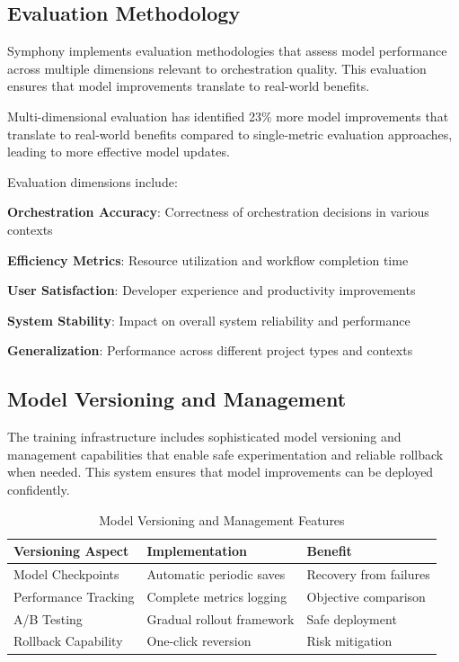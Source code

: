 \subsection*{Evaluation Methodology}

Symphony implements evaluation methodologies that assess model performance across multiple dimensions relevant to orchestration quality. This evaluation ensures that model improvements translate to real-world benefits.

\begin{successbox}
Multi-dimensional evaluation has identified 23\% more model improvements that translate to real-world benefits compared to single-metric evaluation approaches, leading to more effective model updates.
\end{successbox}

Evaluation dimensions include:

\begin{expandedlist}
    \item \textbf{Orchestration Accuracy}: Correctness of orchestration decisions in various contexts
    \item \textbf{Efficiency Metrics}: Resource utilization and workflow completion time
    \item \textbf{User Satisfaction}: Developer experience and productivity improvements
    \item \textbf{System Stability}: Impact on overall system reliability and performance
    \item \textbf{Generalization}: Performance across different project types and contexts
\end{expandedlist}

\subsection*{Model Versioning and Management}

The training infrastructure includes sophisticated model versioning and management capabilities that enable safe experimentation and reliable rollback when needed. This system ensures that model improvements can be deployed confidently.

\begin{table}[ht]
\centering
\begin{tabular}{@{}lll@{}}
\toprule
\textbf{Versioning Aspect} & \textbf{Implementation} & \textbf{Benefit} \\
\midrule
Model Checkpoints & Automatic periodic saves & Recovery from failures \\
Performance Tracking & Complete metrics logging & Objective comparison \\
A/B Testing & Gradual rollout framework & Safe deployment \\
Rollback Capability & One-click reversion & Risk mitigation \\
\bottomrule
\end{tabular}
\caption{Model Versioning and Management Features}
\end{table}

